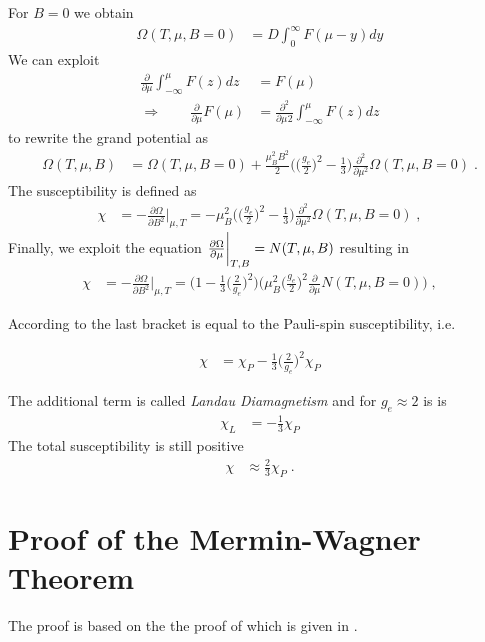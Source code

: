 %
For $B=0$ we obtain
%
\begin{align*}
\Omega(T,\mu,B=0) &= D  \int_{0}^{\infty} F(\mu-y)dy 
\end{align*}
%
We can exploit
%
\begin{align*}
\frac{\partial }{\partial \mu} \int_{-\infty}^{\mu} F(z)dz &= F(\mu)\\
\Rightarrow\qquad  \frac{\partial }{\partial \mu}F(\mu) &= \frac{\partial^{2} }{\partial \mu^{}2} \int_{-\infty}^{\mu} F(z)dz 
\end{align*}
%
to rewrite  the grand potential as
%
\begin{align*}
\Omega(T,\mu,B) &= \Omega(T,\mu,B=0) +
\frac{\mu_{B}^{2}B^{2}}{2}\bigg(  \bigg(\frac{g_{e}}{2}\bigg)^{2} - \frac{1}{3}  \bigg)
 \frac{\partial^{2} }{\partial \mu^{2}}\Omega(T,\mu,B=0)\;.
\end{align*}
%
The susceptibility is defined as 
%
\begin{align*}
\chi&= -\frac{\partial \Omega}{\partial B^{2}}\bigg|_{\mu,T} = 
-\mu_{B}^{2}\bigg(  \bigg(\frac{g_{e}}{2}\bigg)^{2} - \frac{1}{3}  \bigg)
 \frac{\partial^{2} }{\partial \mu^{2}}\Omega(T,\mu,B=0)\;,
\end{align*}
%
Finally, we exploit the equation  $\frac{\partial \Omega}{\partial \mu}\bigg|_{T,B}=N(T,\mu,B)$ resulting in
\begin{align*}
\chi&= -\frac{\partial \Omega}{\partial B^{2}}\bigg|_{\mu,T} = 
 \bigg(  1 - \frac{1}{3} \bigg(\frac{2}{g_{e}}\bigg)^{2} \bigg)
\bigg(\mu_{B}^{2}\bigg(\frac{g_{e}}{2}\bigg)^{2}  \frac{\partial }{\partial \mu}N(T,\mu,B=0)\bigg)\;,
\end{align*}


According to  the last bracket is equal to the Pauli-spin susceptibility, i.e.

\begin{align*}
\chi&= 
\chi_{P} - \frac{1}{3} \bigg(\frac{2}{g_{e}}\bigg)^{2} \chi_{P}
\end{align*}

The additional term is called {\em Landau Diamagnetism} and for $g_{e}\approx 2$ is 
is
%
\begin{align*}
\chi_{L}&=-\frac{1}{3} \chi_{P}
\end{align*}
%
The total susceptibility is still positive 
%
\begin{align*}
\chi &\approx \frac{2}{3} \chi_{P}\;.
\end{align*}
%

\section{Proof of the Mermin-Wagner Theorem\label{app:mermin:wagner}}
The proof is based on the
%
the proof of which is given in .

